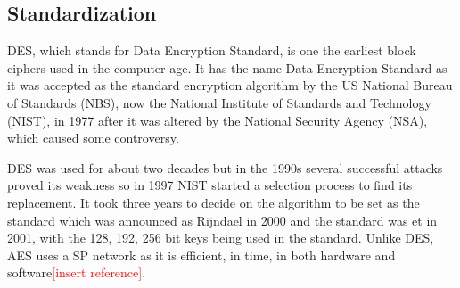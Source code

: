 \documentclass[12pt,twoside,a4paper]{report}
\begin{document}
    \subsection{Standardization}
    DES, which stands for Data Encryption Standard, is one the earliest block ciphers used in the computer age.
    It has the name Data Encryption Standard as it was accepted as the standard encryption algorithm by the US National Bureau of Standards (NBS), now the National Institute of Standards and Technology (NIST), in 1977 after it was altered by the National Security Agency (NSA), which caused some controversy.
    
    DES was used for about two decades but in the 1990s several successful attacks proved its weakness\cite{Team} so in 1997 NIST started a selection process to find its replacement.
    It took three years to decide on the algorithm to be set as the standard which was announced as Rijndael in 2000 and the standard was et in 2001, with the 128, 192, 256 bit keys being used in the standard\cite{ComputerSecurityDivision2001}.
    Unlike DES, AES uses a SP network as it is efficient, in time, in both hardware and software\textcolor{red}{[insert reference]}.
    
\end{document}
